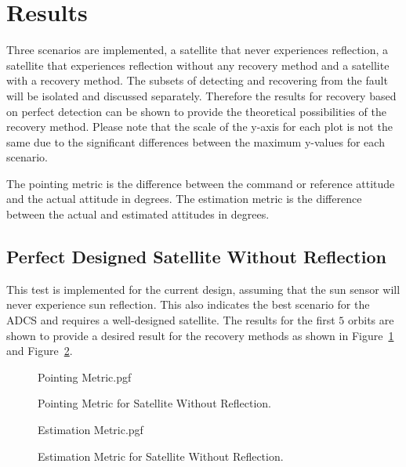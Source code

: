 \documentclass[letterpaper, 10 pt, conference]{ieeeconf}  %
\begin{document}
\section{Results}
\label{section:Results}
Three scenarios are implemented, a satellite that never experiences reflection, a satellite that experiences reflection without any recovery method and a satellite with a recovery method. The subsets of detecting and recovering from the fault will be isolated and discussed separately. Therefore the results for recovery based on perfect detection can be shown to provide the theoretical possibilities of the recovery method. Please note that the scale of the y-axis for each plot is not the same due to the significant differences between the maximum y-values for each scenario.

The pointing metric is the difference between the command or reference attitude and the actual attitude in degrees. The estimation metric is the difference between the actual and estimated attitudes in degrees.

\subsection{Perfect Designed Satellite Without Reflection}
This test is implemented for the current design, assuming that the sun sensor will never experience sun reflection. This also indicates the best scenario for the ADCS and requires a well-designed satellite. The results for the first $5$ orbits are shown to provide a desired result for the recovery methods as shown in Figure~\ref{fig:Pointing Accuracy None} and Figure~\ref{fig:Estimation Accuracy None}. 
\begin{figure}[!htb]
	\begin{center}
		{Pointing Metric.pgf}
	\end{center}
	\caption[Pointing Metric for Satellite Without Reflection]{Pointing Metric for Satellite Without Reflection.}
	\label{fig:Pointing Accuracy None}
\end{figure}

\begin{figure}[!htb]
	\begin{center}
		{Estimation Metric.pgf}
	\end{center}
	\caption[Estimation Metric for Satellite Without Reflection]{Estimation Metric for Satellite Without Reflection.}
	\label{fig:Estimation Accuracy None}
\end{figure}
\end{document}
